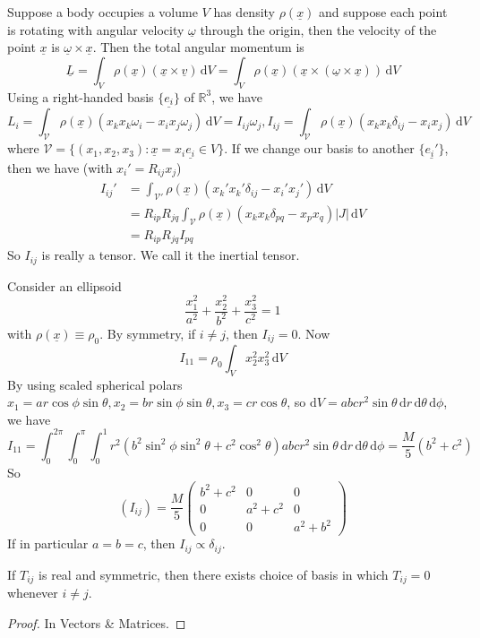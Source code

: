 Suppose a body occupies a volume $V$ has density $\rho(\underline{x})$ and suppose each point is rotating with angular velocity $\underline{\omega}$ through the origin, then the velocity of the point $\underline{x}$ is $\underline{\omega}\times\underline{x}$.
Then the total angular momentum is
$$\underline{L}=\int_V\rho(\underline{x})(\underline{x}\times\underline{v})\,\mathrm dV=\int_V\rho(\underline{x})(\underline{x}\times(\underline{\omega}\times\underline{x}))\,\mathrm dV$$
Using a right-handed basis $\{\underline{e_i}\}$ of $\mathbb R^3$, we have
$$L_i=\int_{\mathcal V}\rho(\underline{x})(x_kx_k\omega_i-x_ix_j\omega_j)\,\mathrm dV=I_{ij}\omega_j,I_{ij}=\int_{\mathcal V}\rho(\underline{x})(x_kx_k\delta_{ij}-x_ix_j)\,\mathrm dV$$
where $\mathcal V=\{(x_1,x_2,x_3):\underline{x}=x_i\underline{e_i}\in V\}$.
If we change our basis to another $\{\underline{e_i'}\}$, then we have (with $x_i'=R_{ij}x_j$)
\begin{align*}
    I_{ij}'&=\int_{\mathcal V'}\rho(\underline{x})(x_k'x_k'\delta_{ij}-x_i'x_j')\,\mathrm dV\\
    &=R_{ip}R_{jq}\int_{\mathcal V}\rho(\underline{x})(x_kx_k\delta_{pq}-x_px_q)|J|\,\mathrm dV\\
    &=R_{ip}R_{jq}I_{pq}
\end{align*}
So $I_{ij}$ is really a tensor.
We call it the inertial tensor.
\begin{example}
    Consider an ellipsoid
    $$\frac{x_1^2}{a^2}+\frac{x_2^2}{b^2}+\frac{x_3^2}{c^2}=1$$
    with $\rho(\underline{x})\equiv\rho_0$.
    By symmetry, if $i\neq j$, then $I_{ij}=0$.
    Now
    $$I_{11}=\rho_0\int_Vx_2^2x_3^2\,\mathrm dV$$
    By using scaled spherical polars $x_1=ar\cos\phi\sin\theta,x_2=br\sin\phi\sin\theta,x_3=cr\cos\theta$, so $\mathrm dV=abcr^2\sin\theta\,\mathrm dr\,\mathrm d\theta\,\mathrm d\phi$, we have
    $$I_{11}=\int_0^{2\pi}\int_0^\pi\int_0^1 r^2(b^2\sin^2\phi\sin^2\theta+c^2\cos^2\theta)abcr^2\sin\theta\,\mathrm dr\,\mathrm d\theta\,\mathrm d\phi=\frac{M}{5}(b^2+c^2)$$
    So
    $$(I_{ij})=\frac{M}{5}\begin{pmatrix}
        b^2+c^2&0&0\\
        0&a^2+c^2&0\\
        0&0&a^2+b^2
    \end{pmatrix}$$
    If in particular $a=b=c$, then $I_{ij}\propto\delta_{ij}$.
\end{example}
\begin{proposition}
    If $T_{ij}$ is real and symmetric, then there exists choice of basis in which $T_{ij}=0$ whenever $i\neq j$.
\end{proposition}
\begin{proof}
    In Vectors \& Matrices.
\end{proof}
